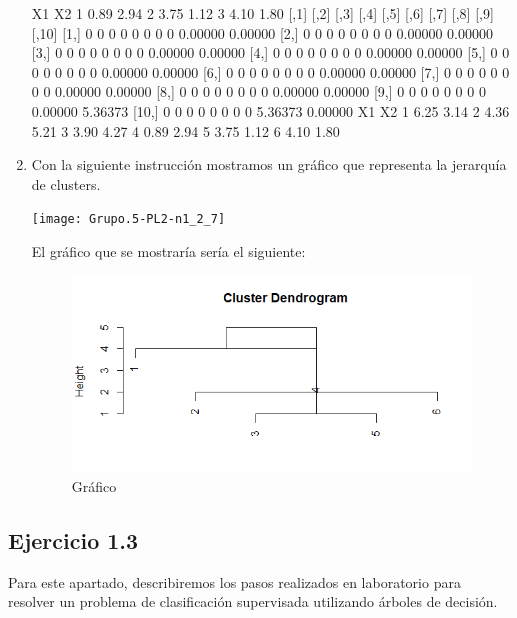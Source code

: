 \documentclass[parskip=full]{scrartcl}
\begin{document}
\begin{enumerate}
\begin{Schunk}
\begin{Soutput}
    X1   X2
1 0.89 2.94
2 3.75 1.12
3 4.10 1.80
      [,1] [,2] [,3] [,4] [,5] [,6] [,7] [,8]    [,9]   [,10]
 [1,]    0    0    0    0    0    0    0    0 0.00000 0.00000
 [2,]    0    0    0    0    0    0    0    0 0.00000 0.00000
 [3,]    0    0    0    0    0    0    0    0 0.00000 0.00000
 [4,]    0    0    0    0    0    0    0    0 0.00000 0.00000
 [5,]    0    0    0    0    0    0    0    0 0.00000 0.00000
 [6,]    0    0    0    0    0    0    0    0 0.00000 0.00000
 [7,]    0    0    0    0    0    0    0    0 0.00000 0.00000
 [8,]    0    0    0    0    0    0    0    0 0.00000 0.00000
 [9,]    0    0    0    0    0    0    0    0 0.00000 5.36373
[10,]    0    0    0    0    0    0    0    0 5.36373 0.00000
    X1   X2
1 6.25 3.14
2 4.36 5.21
3 3.90 4.27
4 0.89 2.94
5 3.75 1.12
6 4.10 1.80
\end{Soutput}
\end{Schunk}
  

    \item Con la siguiente instrucción mostramos un gráfico que representa la jerarquía de clusters.


\begin{Schunk}
\end{Schunk}
\texttt{[image: Grupo.5-PL2-n1\_2\_7]}


    El gráfico que se mostraría sería el siguiente:
    \begin{figure}
        \centering
        \includegraphics[width=0.5\linewidth]{images/imagen4.png}
        \caption{Gráfico}
        \label{fig:enter-label}
    \end{figure}
\end{enumerate}

\subsection{Ejercicio 1.3}

Para este apartado, describiremos los pasos realizados en laboratorio para resolver un problema de clasificación supervisada utilizando árboles de decisión.
\end{document}
